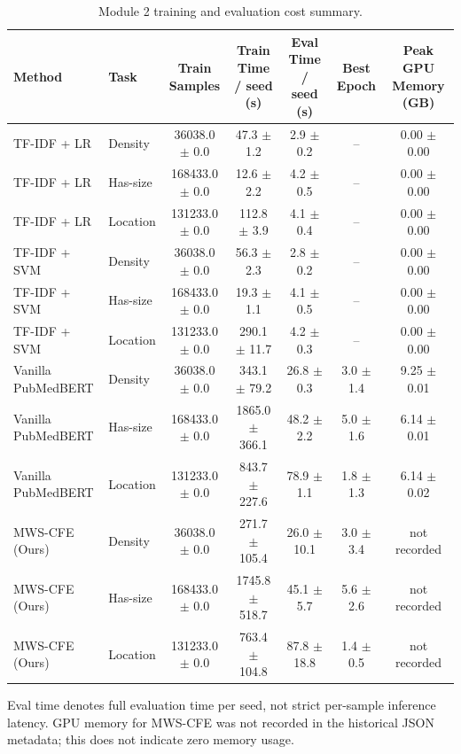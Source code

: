 \begin{table}[htbp]
\centering
\scriptsize
\caption{Module 2 training and evaluation cost summary.}
\label{tab:module2-efficiency}
\begin{tabular}{llccccc}
\hline
Method & Task & Train Samples & Train Time / seed (s) & Eval Time / seed (s) & Best Epoch & Peak GPU Memory (GB) \\
\hline
TF-IDF + LR & Density & 36038.0 $\pm$ 0.0 & 47.3 $\pm$ 1.2 & 2.9 $\pm$ 0.2 & -- & 0.00 $\pm$ 0.00 \\
TF-IDF + LR & Has-size & 168433.0 $\pm$ 0.0 & 12.6 $\pm$ 2.2 & 4.2 $\pm$ 0.5 & -- & 0.00 $\pm$ 0.00 \\
TF-IDF + LR & Location & 131233.0 $\pm$ 0.0 & 112.8 $\pm$ 3.9 & 4.1 $\pm$ 0.4 & -- & 0.00 $\pm$ 0.00 \\
TF-IDF + SVM & Density & 36038.0 $\pm$ 0.0 & 56.3 $\pm$ 2.3 & 2.8 $\pm$ 0.2 & -- & 0.00 $\pm$ 0.00 \\
TF-IDF + SVM & Has-size & 168433.0 $\pm$ 0.0 & 19.3 $\pm$ 1.1 & 4.1 $\pm$ 0.5 & -- & 0.00 $\pm$ 0.00 \\
TF-IDF + SVM & Location & 131233.0 $\pm$ 0.0 & 290.1 $\pm$ 11.7 & 4.2 $\pm$ 0.3 & -- & 0.00 $\pm$ 0.00 \\
Vanilla PubMedBERT & Density & 36038.0 $\pm$ 0.0 & 343.1 $\pm$ 79.2 & 26.8 $\pm$ 0.3 & 3.0 $\pm$ 1.4 & 9.25 $\pm$ 0.01 \\
Vanilla PubMedBERT & Has-size & 168433.0 $\pm$ 0.0 & 1865.0 $\pm$ 366.1 & 48.2 $\pm$ 2.2 & 5.0 $\pm$ 1.6 & 6.14 $\pm$ 0.01 \\
Vanilla PubMedBERT & Location & 131233.0 $\pm$ 0.0 & 843.7 $\pm$ 227.6 & 78.9 $\pm$ 1.1 & 1.8 $\pm$ 1.3 & 6.14 $\pm$ 0.02 \\
MWS-CFE (Ours) & Density & 36038.0 $\pm$ 0.0 & 271.7 $\pm$ 105.4 & 26.0 $\pm$ 10.1 & 3.0 $\pm$ 3.4 & not recorded \\
MWS-CFE (Ours) & Has-size & 168433.0 $\pm$ 0.0 & 1745.8 $\pm$ 518.7 & 45.1 $\pm$ 5.7 & 5.6 $\pm$ 2.6 & not recorded \\
MWS-CFE (Ours) & Location & 131233.0 $\pm$ 0.0 & 763.4 $\pm$ 104.8 & 87.8 $\pm$ 18.8 & 1.4 $\pm$ 0.5 & not recorded \\
\hline
\end{tabular}
\vspace{0.4em}
\parbox{0.96\linewidth}{\footnotesize
Eval time denotes full evaluation time per seed, not strict per-sample inference latency. GPU memory for MWS-CFE was not recorded in the historical JSON metadata; this does not indicate zero memory usage.}
\end{table}
